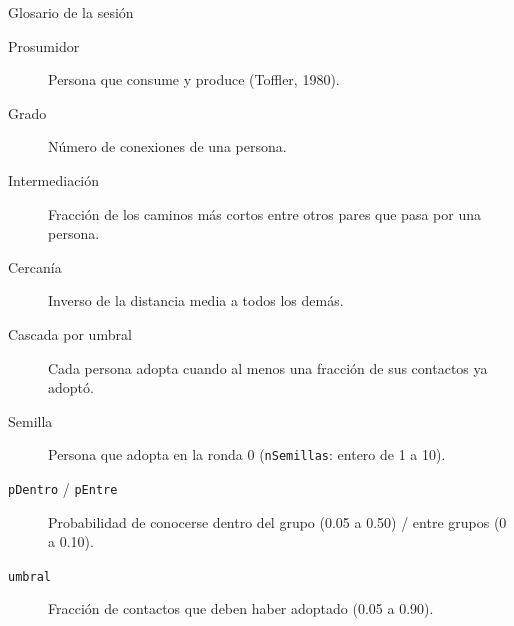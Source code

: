 \documentclass[aspectratio=169,xcolor=dvipsnames]{beamer}
\begin{document}
\begin{frame}{Glosario de la sesión}
\scriptsize
\begin{description}
  \item[Prosumidor] Persona que consume y produce (Toffler, 1980).
  \item[Grado] Número de conexiones de una persona.
  \item[Intermediación] Fracción de los caminos más cortos entre otros pares que pasa por una persona.
  \item[Cercanía] Inverso de la distancia media a todos los demás.
  \item[Cascada por umbral] Cada persona adopta cuando al menos una fracción de sus contactos ya adoptó.
  \item[Semilla] Persona que adopta en la ronda 0 (\texttt{nSemillas}: entero de 1 a 10).
  \item[\texttt{pDentro} / \texttt{pEntre}] Probabilidad de conocerse dentro del grupo (0.05 a 0.50) / entre grupos (0 a 0.10).
  \item[\texttt{umbral}] Fracción de contactos que deben haber adoptado (0.05 a 0.90).
\end{description}
\end{frame}
\end{document}
